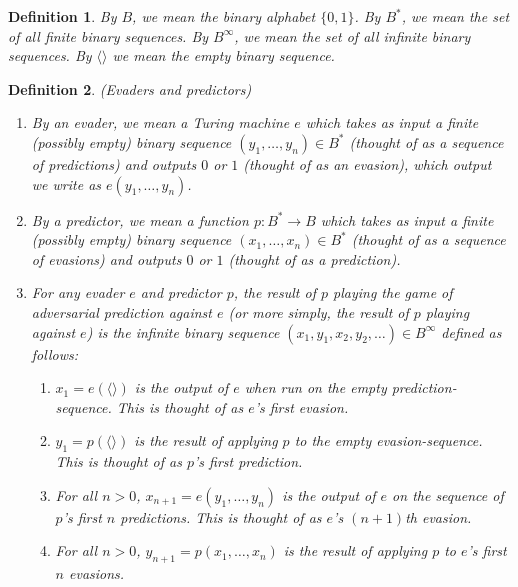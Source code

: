 \documentclass{article}
\newtheorem{definition}{Definition}
\begin{document}
\begin{definition}
By $B$, we mean the binary alphabet $\{0,1\}$. By $B^*$, we mean the set of all
finite binary sequences. By $B^\infty$, we mean the set of all infinite binary
sequences. By $\langle\rangle$ we mean the empty binary sequence.
\end{definition}

\begin{definition}
\label{evaderpredictordefn}
    (Evaders and predictors)
    \begin{enumerate}
        \item
        By an \emph{evader}, we mean a Turing machine $e$
        which takes as input a finite (possibly empty) binary sequence
        $(y_1,\ldots,y_n)\in B^*$
        (thought of as a sequence of \emph{predictions})
        and outputs $0$ or $1$ (thought of as an \emph{evasion}), which output
        we write as $e(y_1,\ldots,y_n)$.
        \item
        By a \emph{predictor}, we mean a function $p:B^*\to B$
        which takes as input a finite (possibly empty) binary sequence
        $(x_1,\ldots,x_n)\in B^*$
        (thought of as a sequence of \emph{evasions})
        and outputs $0$ or $1$ (thought of as a \emph{prediction}).
        \item
        For any evader $e$ and predictor $p$, the \emph{result of $p$ playing the
        game of adversarial prediction against $e$} (or more simply, the \emph{result of
        $p$ playing against $e$}) is the infinite binary sequence
        $(x_1,y_1,x_2,y_2,\ldots)\in B^\infty$
        defined as follows:
        \begin{enumerate}
            \item
            $x_1=e(\langle\rangle)$ is
            the output of $e$ when run on the empty prediction-sequence.
            This is thought of as $e$'s first evasion.
            \item
            $y_1=p(\langle\rangle)$ is
            the result of applying $p$ to the empty evasion-sequence.
            This is thought of as $p$'s first prediction.
            \item
            For all $n>0$,
            $x_{n+1}=e(y_1,\ldots,y_n)$ is
            the output of $e$ on the sequence of $p$'s first $n$ predictions.
            This is thought of as $e$'s $(n+1)$th evasion.
            \item
            For all $n>0$,
            $y_{n+1}=p(x_1,\ldots,x_n)$ is
            the result of applying $p$ to $e$'s first $n$ evasions.

\end{enumerate}
\end{enumerate}
\end{definition}
\end{document}
